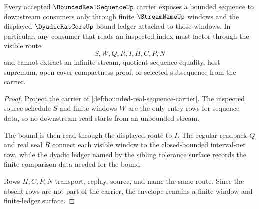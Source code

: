\begin{theorem}
\label{thm:bounded-real-sequence-window-envelope}
Every accepted $\BoundedRealSequenceUp$ carrier exposes a bounded sequence to downstream consumers only through finite $\StreamNameUp$ windows and the displayed $\DyadicRatCoreUp$ bound ledger attached to those windows. In particular, any consumer that reads an inspected index must factor through the visible route
$$
S,W,Q,R,I,H,C,P,N
$$
and cannot extract an infinite stream, quotient sequence equality, host supremum, open-cover compactness proof, or selected subsequence from the carrier.
\end{theorem}
\begin{proof}
Project the carrier of \autoref{def:bounded-real-sequence-carrier}. The inspected source schedule $S$ and finite windows $W$ are the only entry rows for sequence data, so no downstream read starts from an unbounded stream.

The bound is then read through the displayed route to $I$. The regular readback $Q$ and real seal $R$ connect each visible window to the closed-bounded interval-net row, while the dyadic ledger named by the sibling tolerance surface records the finite comparison data needed for the bound.

Rows $H,C,P,N$ transport, replay, source, and name the same route. Since the absent rows are not part of the carrier, the envelope remains a finite-window and finite-ledger surface.
\end{proof}


